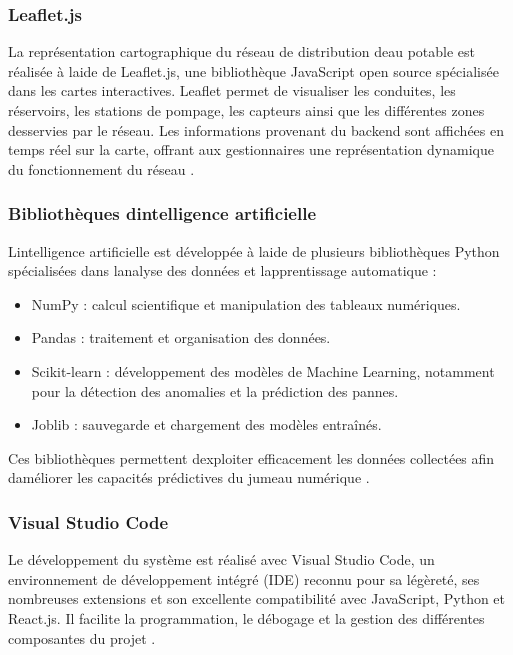 \subsubsection{Leaflet.js}\label{e-leaflet.js}

La représentation cartographique du réseau de distribution
d\textquotesingle eau potable est réalisée à l\textquotesingle aide de
Leaflet.js, une bibliothèque JavaScript open source spécialisée dans les
cartes interactives. Leaflet permet de visualiser les conduites, les
réservoirs, les stations de pompage, les capteurs ainsi que les
différentes zones desservies par le réseau. Les informations provenant
du backend sont affichées en temps réel sur la carte, offrant aux
gestionnaires une représentation dynamique du fonctionnement du réseau
\cite{ref119}.

\subsubsection{Bibliothèques d\textquotesingle intelligence
	artificielle}\label{f-bibliothuxe8ques-dintelligence-artificielle}

L\textquotesingle intelligence artificielle est développée à
l\textquotesingle aide de plusieurs bibliothèques Python spécialisées
dans l\textquotesingle analyse des données et
l\textquotesingle apprentissage automatique :

\begin{itemize}
	\item
	NumPy : calcul scientifique et manipulation des tableaux numériques.
	\item
	Pandas : traitement et organisation des données.
	\item
	Scikit-learn : développement des modèles de Machine Learning,
	notamment pour la détection des anomalies et la prédiction des pannes.
	\item
	Joblib : sauvegarde et chargement des modèles entraînés.
\end{itemize}

Ces bibliothèques permettent d\textquotesingle exploiter efficacement
les données collectées afin d\textquotesingle améliorer les capacités
prédictives du jumeau numérique \cite{ref120}.

\subsubsection{Visual Studio Code}\label{g-visual-studio-code}

Le développement du système est réalisé avec Visual Studio Code, un
environnement de développement intégré (IDE) reconnu pour sa légèreté,
ses nombreuses extensions et son excellente compatibilité avec
JavaScript, Python et React.js. Il facilite la programmation, le
débogage et la gestion des différentes composantes du projet \cite{ref121}.

